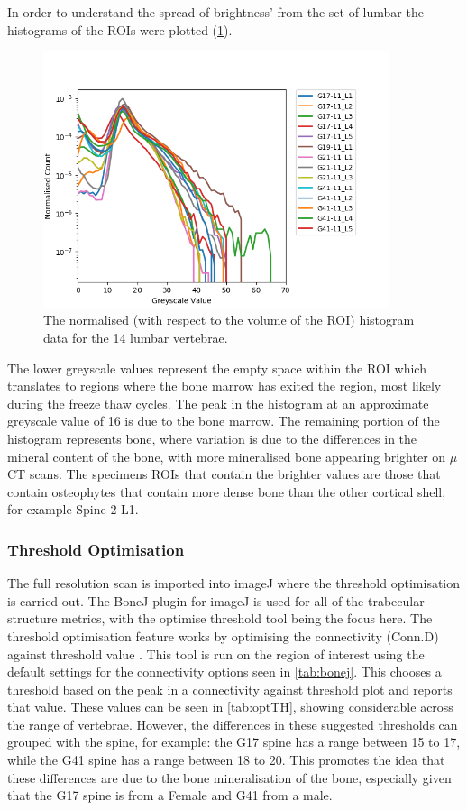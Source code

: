 In order to understand the spread of brightness' from the set of lumbar the
histograms of the ROIs were plotted (\cref{fig:normalisedhistogram}).

\begin{figure}[ht!]
  \centering
  \includegraphics[width=4in]{Chapters/Chapter_HT_images/Normalised_Histogram.png}
  \caption{The normalised (with respect to the volume of the ROI) histogram data
    for the 14 lumbar vertebrae.}
  \label{fig:normalisedhistogram}
\end{figure}

The lower greyscale values represent the empty space within the ROI which
translates to regions where the bone marrow has exited the region, most likely
during the freeze thaw cycles. The peak in the histogram at an approximate
greyscale value of 16 is due to the bone marrow. The remaining portion of the
histogram represents bone, where variation is due to the differences in the
mineral content of the bone, with more mineralised bone appearing brighter on
$\mu$CT scans. The specimens ROIs that contain the brighter values are those
that contain osteophytes that contain more dense bone than the other cortical
shell, for example Spine 2 L1.

\subsubsection{Threshold Optimisation}\label{th_opt}


The full resolution scan is imported into imageJ where the threshold optimisation is carried out.
The BoneJ plugin for imageJ is used for all of the trabecular structure metrics, with the optimise threshold tool being the focus here.
The threshold optimisation feature works by optimising the connectivity (Conn.D) against threshold value \autocite{Doubea2010}.
This tool is run on the region of interest using the default settings for the connectivity options seen in \cref{tab:bonej}.
This chooses a threshold based on the peak in a connectivity against threshold plot and reports that value.
These values can be seen in \cref{tab:optTH}, showing considerable across the range of vertebrae.
However, the differences in these suggested thresholds can grouped with the spine, for example: the G17 spine has a range between 15 to 17, while the G41 spine has a range between 18 to 20.
This promotes the idea that these differences are due to the bone mineralisation of the bone, especially given that the G17 spine is from a Female and G41 from a male.

